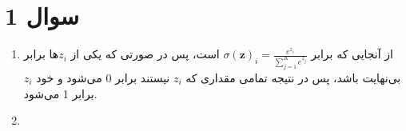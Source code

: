 \section*{سوال 1}
\begin{enumerate}
    \item از آنجایی که  برابر $\sigma(\mathbf{z})_i = \frac{e^{z_i}}{\sum_{j=1}^K e^{z_j}}$ است،
    پس در صورتی که یکی از
    $z_i$ها
    برابر بی‌نهایت باشد، پس در نتیجه تمامی مقداری که
    $z_i$
    نیستند برابر 0 می‌شود و خود
    $z_i$
    برابر 1 می‌شود.
    \item 
\end{enumerate}